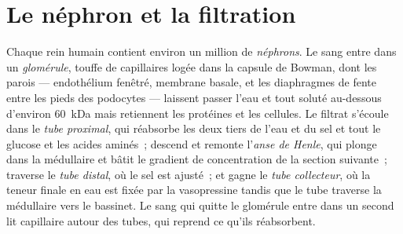 \section{Le néphron et la filtration}

\begin{definition}[Le néphron]\label{def:b3:renal-osmoregulation:nephron}
Chaque rein humain contient environ un million de \emph{néphrons}. Le
sang entre dans un \emph{glomérule}, touffe de capillaires logée dans la
capsule de Bowman, dont les parois --- endothélium fenêtré, membrane
basale, et les diaphragmes de fente entre les pieds des podocytes ---
laissent passer l'eau et tout soluté au-dessous d'environ \qty{60}{kDa}
mais retiennent les protéines et les cellules. Le filtrat s'écoule dans
le \emph{tube proximal}, qui réabsorbe les deux tiers de l'eau et du sel
et tout le glucose et les acides aminés~; descend et remonte
l'\emph{anse de Henle}, qui plonge dans la médullaire et bâtit le
gradient de concentration de la section suivante~; traverse le
\emph{tube distal}, où le sel est ajusté~; et gagne le \emph{tube
collecteur}, où la teneur finale en eau est fixée par la vasopressine
tandis que le tube traverse la médullaire vers le bassinet. Le sang qui
quitte le glomérule entre dans un second lit capillaire autour des
tubes, qui reprend ce qu'ils réabsorbent.
\end{definition}

